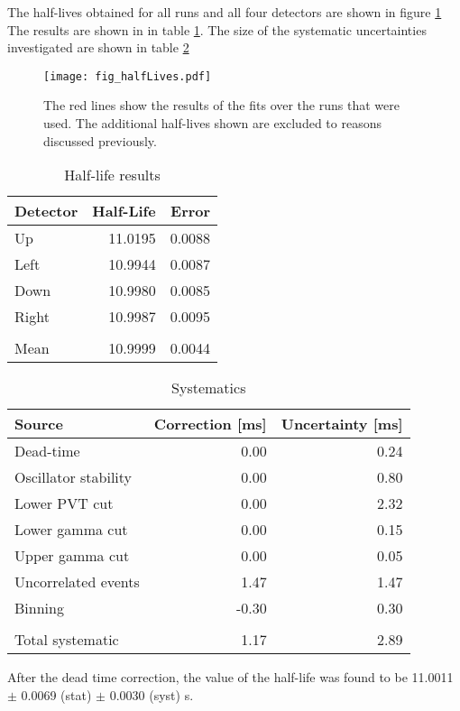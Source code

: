 \documentclass[MaxHughesThesis.tex]{subfiles}
\begin{document}
The half-lives obtained for all runs and all four detectors are shown in figure \ref{fig:PVT2by2}
The results  are shown in  in table \ref{tab:PVTTable}.
The size of the systematic uncertainties investigated are shown in table \ref{tab:SysTable} 
\begin{figure}[!htb]
	\centerline{\texttt{[image: fig\_halfLives.pdf]}}
	\caption{The red lines show the results of the fits over the runs that were used.
		 The additional half-lives shown are excluded to reasons discussed previously. 
		}
	\label{fig:PVT2by2}
\end{figure}
	\begin{table}[!hbt]
			\centering
			\caption{Half-life results}
			\begin{tabular}{lrr}
			Detector & Half-Life & Error \\ \hline
			Up & 11.0195 & 0.0088 \\
			Left & 10.9944 & 0.0087 \\
			Down & 10.9980 & 0.0085 \\
			Right & 10.9987 & 0.0095 \\ 
			      &		& 	 \\
			Mean & 10.9999 & 0.0044
			\end{tabular}
			\label{tab:PVTTable}
	\end{table}
\begin{table}[!hbt]
	\caption{Systematics}
	\centering
	\label{tab:err-budget}
		\begin{tabular}{lrr}
		Source & Correction [ms] & Uncertainty [ms] \\ \hline
		Dead-time & 0.00 & 0.24 \\
		Oscillator stability & 0.00 & 0.80 \\
		Lower PVT cut & 0.00 & 2.32 \\
		Lower gamma cut & 0.00 &  0.15\\
		Upper gamma cut  & 0.00 & 0.05 \\ 
		Uncorrelated events & 1.47 & 1.47 \\
		Binning & -0.30 & 0.30 \\
			&	&	\\
		Total systematic & 1.17 & 2.89
		\end{tabular}
	\label{tab:SysTable}
\end{table}
After the dead time correction, the value of the half-life was found to be 11.0011 $\pm$ 0.0069 (stat) $\pm$ 0.0030 (syst) s.
\end{document}
